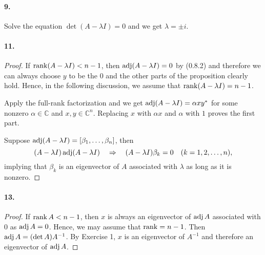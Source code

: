   \paragraph{9.}
  \begin{solution}
    Solve the equation $\det(A-\lambda I) = 0$ and we get $\lambda=\pm i$.
  \end{solution}

  \paragraph{11.}
  \begin{proof}
    If $\operatorname{rank}(A-\lambda I)<n-1$, then $\operatorname{adj}(A-\lambda I)=0$ by (0.8.2) and 
    therefore we can always choose $y$ to be the $0$ and the other parts of the 
    proposition clearly hold. Hence, in the following discussion, we assume that
    $\operatorname{rank}(A-\lambda I)=n-1$. \par
    Apply the full-rank factorization and we get $\operatorname{adj}(A-\lambda I)=\alpha xy^*$
    for some nonzero $\alpha\in\mathbb{C}$ and $x,y\in\mathbb{C}^n$. Replacing 
    $x$ with $\alpha x$ and $\alpha$ with $1$ proves the first part.\par
    Suppose $\operatorname{adj}(A-\lambda I)=[\beta_1,\dots,\beta_n]$, then
    \[
      (A-\lambda I)\operatorname{adj}(A-\lambda I) \quad\Rightarrow\quad
      (A-\lambda I)\beta_k = 0 \quad(k=1,2,\dots,n),
    \]
    implying that $\beta_k$ is an eigenvector of $A$ associated with $\lambda$ 
    as long as it is nonzero.
  \end{proof}

  \paragraph{13.}
  \begin{proof}
    If $\operatorname{rank} A < n -1$, then $x$ is always an eigenvector of $\operatorname{adj} A$ 
    associated with $0$ as $\operatorname{adj} A = 0$. Hence, we may assume that $\operatorname{rank} = n - 
    1$. Then $\operatorname{adj} A = (\det A)A^{-1}$. By Exercise 1, $x$ is an eigenvector of 
    $A^{-1}$ and therefore an eigenvector of $\operatorname{adj} A$.
  \end{proof}
  
